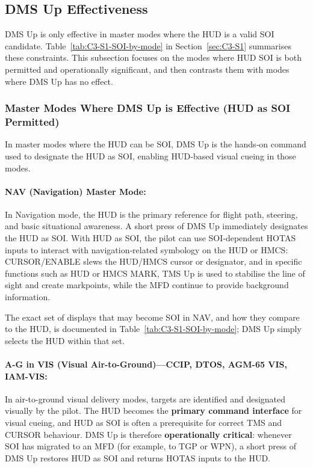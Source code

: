 \documentclass[11pt, a4paper, twoside]{report}
\begin{document}
\subsection{DMS Up Effectiveness}
\label{sec:C3-S2-S1}

DMS Up is only effective in master modes where the HUD is a valid SOI candidate. Table~\ref{tab:C3-S1-SOI-by-mode} in Section~\ref{sec:C3-S1} summarises these constraints. This subsection focuses on the modes where HUD SOI is both permitted and operationally significant, and then contrasts them with modes where DMS Up has no effect.

\subsubsection{Master Modes Where DMS Up is Effective (HUD as SOI Permitted)}
\label{sec:C3-S2-S1-S1}

In master modes where the HUD can be SOI, DMS Up is the hands‑on command used to designate the HUD as SOI, enabling HUD‑based visual cueing in those modes.

\paragraph*{NAV (Navigation) Master Mode:}
In Navigation mode, the HUD is the primary reference for flight path, steering, and basic situational awareness. A short press of DMS Up immediately designates the HUD as SOI. With HUD as SOI, the pilot can use SOI‑dependent HOTAS inputs to interact with navigation‑related symbology on the HUD or HMCS: CURSOR/ENABLE slews the HUD/HMCS cursor or designator, and in specific functions such as HUD or HMCS MARK, TMS Up is used to stabilise the line of sight and create markpoints, while the MFD continue to provide background information.

The exact set of displays that may become SOI in NAV, and how they compare to the HUD, is documented in Table~\ref{tab:C3-S1-SOI-by-mode}; DMS Up simply selects the HUD within that set.

\paragraph*{A-G in VIS (Visual Air-to-Ground)---CCIP, DTOS, AGM-65 VIS, IAM-VIS:}
In air-to-ground visual delivery modes, targets are identified and designated visually by the pilot. The HUD becomes the \textbf{primary command interface} for visual cueing, and HUD as SOI is often a prerequisite for correct TMS and CURSOR behaviour. DMS Up is therefore \textbf{operationally critical}: whenever SOI has migrated to an MFD (for example, to TGP or WPN), a short press of DMS Up restores HUD as SOI and returns HOTAS inputs to the HUD.
\end{document}
